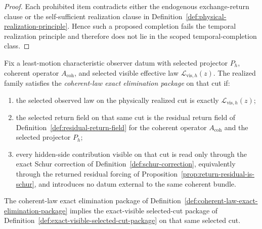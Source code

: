 \begin{proof}
Each prohibited item contradicts either the endogenous exchange-return clause
or the self-sufficient realization clause in
Definition~\ref{def:physical-realization-principle}. Hence such a proposed
completion fails the temporal realization principle and therefore does not lie
in the scoped temporal-completion class.
\end{proof}

\begin{definition}
\label{def:coherent-law-exact-elimination-package}
Fix a least-motion characteristic observer datum with selected projector
\(P_h\), coherent operator \(A_{\mathrm{coh}}\), and selected visible
effective law \(\mathcal L_{\mathrm{vis},h}(z)\). The realized family
satisfies the \emph{coherent-law exact elimination package} on that cut if:
\begin{enumerate}[label=(\roman*), leftmargin=2em, itemsep=0.2em]
\item the selected observed law on the physically realized cut is exactly
      \(\mathcal L_{\mathrm{vis},h}(z)\);
\item the selected return field on that same cut is the residual return field
      of Definition~\ref{def:residual-return-field} for the coherent operator
      \(A_{\mathrm{coh}}\) and the selected projector \(P_h\);
\item every hidden-side contribution visible on that cut is read only through
      the exact Schur correction of
      Definition~\ref{def:schur-correction}, equivalently through the returned
      residual forcing of
      Proposition~\ref{prop:return-residual-is-schur}, and introduces no datum
      external to the same coherent bundle.
\end{enumerate}
\end{definition}

\begin{theorem}
\label{thm:coherent-law-exact-elimination-forces-exact-visible-selected-cut-package}
The coherent-law exact elimination package of
Definition~\ref{def:coherent-law-exact-elimination-package} implies the
exact-visible selected-cut package of
Definition~\ref{def:exact-visible-selected-cut-package} on that same selected
cut.
\end{theorem}

